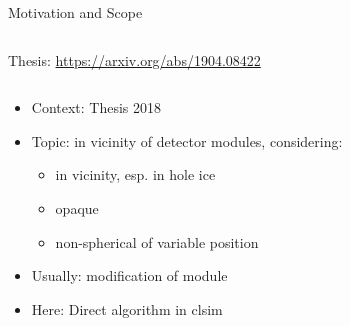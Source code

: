 
\begin{frame}[fragile]{Motivation and Scope}
  \begin{column}{0.6\textwidth}

    \vspace{1cm}
    Thesis: \url{https://arxiv.org/abs/1904.08422}
  \end{column}
  \begin{column}{0.4\textwidth}
    \begin{itemize}
      \item Context: Thesis 2018
      \item Topic:  in vicinity of detector modules, considering:
      \begin{itemize}
        \item {} in vicinity, esp. in hole ice
        \item opaque 
        \item non-spherical  of variable position
      \end{itemize}
      \item Usually:  modification of module 
      \item Here: Direct  algorithm in clsim
    \end{itemize}

    \vspace{2cm}

  \end{column}
\end{frame}


